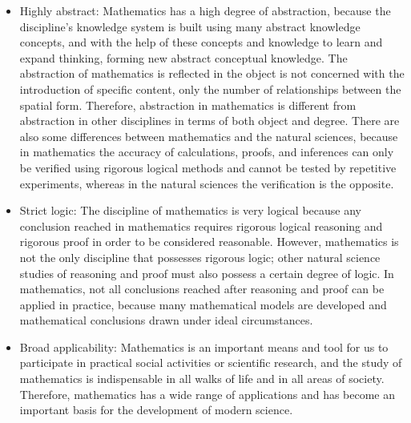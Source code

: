 \documentclass[11pt,en]{elegantpaper}
\begin{document}
\begin{itemize}
	\item Highly abstract: Mathematics has a high degree of abstraction, because the discipline's knowledge system is built using many abstract knowledge concepts, and with the help of these concepts and knowledge to learn and expand thinking, forming new abstract conceptual knowledge. The abstraction of mathematics is reflected in the object is not concerned with the introduction of specific content, only the number of relationships between the spatial form. Therefore, abstraction in mathematics is different from abstraction in other disciplines in terms of both object and degree. There are also some differences between mathematics and the natural sciences, because in mathematics the accuracy of calculations, proofs, and inferences can only be verified using rigorous logical methods and cannot be tested by repetitive experiments, whereas in the natural sciences the verification is the opposite.
	\item Strict logic: The discipline of mathematics is very logical because any conclusion reached in mathematics requires rigorous logical reasoning and rigorous proof in order to be considered reasonable. However, mathematics is not the only discipline that possesses rigorous logic; other natural science studies of reasoning and proof must also possess a certain degree of logic. In mathematics, not all conclusions reached after reasoning and proof can be applied in practice, because many mathematical models are developed and mathematical conclusions drawn under ideal circumstances.
	\item Broad applicability: Mathematics is an important means and tool for us to participate in practical social activities or scientific research, and the study of mathematics is indispensable in all walks of life and in all areas of society. Therefore, mathematics has a wide range of applications and has become an important basis for the development of modern science.
\end{itemize}
\end{document}
